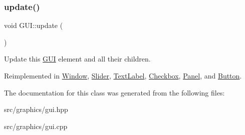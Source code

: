 \subsubsection{\texorpdfstring{update()}{update()}}
{\footnotesize\ttfamily void G\+U\+I\+::update (\begin{DoxyParamCaption}{ }\end{DoxyParamCaption})\hspace{0.3cm}{\ttfamily [virtual]}}

Update this \mbox{\hyperlink{class_g_u_i}{G\+UI}} element and all their children. 

Reimplemented in \mbox{\hyperlink{class_window_aa63a9a2404cebe562174a851f2dc8a01}{Window}}, \mbox{\hyperlink{class_slider_a4ebd527db54ea263c7d0efe4d1f94e1b}{Slider}}, \mbox{\hyperlink{class_text_label_a350a9edc23e4d2a53374fddc5ddc61cc}{Text\+Label}}, \mbox{\hyperlink{class_checkbox_a69c9fb9ce334fc8ff76c49447f1e002d}{Checkbox}}, \mbox{\hyperlink{class_panel_a9e9c0608cf3139833cde6b73dc3ba443}{Panel}}, and \mbox{\hyperlink{class_button_abda97f1ae8e081da3dbd0b77a27cad9d}{Button}}.



The documentation for this class was generated from the following files\+:\begin{DoxyCompactItemize}
\item 
src/graphics/gui.\+hpp\item 
src/graphics/gui.\+cpp\end{DoxyCompactItemize}
